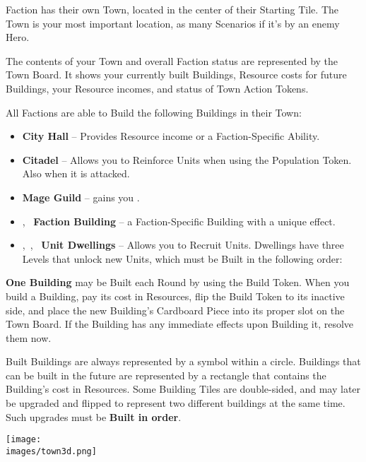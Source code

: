 
\begin{multicols}{2}

 Faction has their own Town, located in the center of their Starting Tile.
The Town is your most important location, as many Scenarios  if it's  by an enemy Hero.\par
The contents of your Town and overall Faction status are represented by the Town Board.
It shows your currently built Buildings, Resource costs for future Buildings, your Resource incomes, and status of Town Action Tokens.\par
All Factions are able to Build the following Buildings in their Town:
\begin{itemize}
  \item {} \textbf{City Hall} -- Provides Resource income or a Faction-Specific Ability.
  \item {} \textbf{Citadel} -- Allows you to Reinforce Units when using the Population Token.
        Also  when it is attacked.
  \item {} \textbf{Mage Guild} -- gains you .
  \item {},~ \textbf{Faction Building} -- a Faction-Specific Building with a unique effect.
  \columnbreak
  \item {},~,~ \textbf{Unit Dwellings} -- Allows you to Recruit Units.
        Dwellings have three Levels that unlock new Units, which must be Built in the following order:   
\end{itemize}
\textbf{One Building} may be Built each Round by using the Build Token.
When you build a Building, pay its cost in Resources, flip the Build Token to its inactive side, and place the new Building’s Cardboard Piece into its proper slot on the Town Board.
If the Building has any immediate effects upon Building it, resolve them now.\par
Built Buildings are always represented by a symbol within a circle.
Buildings that can be built in the future are represented by a rectangle that contains the Building's cost in Resources.
Some Building Tiles are double-sided, and may later be upgraded and flipped to represent two different buildings at the same time. Such upgrades must be \textbf{Built in order}.\par

\end{multicols}

\vfill
\begin{center}
  \texttt{[image: \\images/town3d.png]}
\end{center}
\vfill
